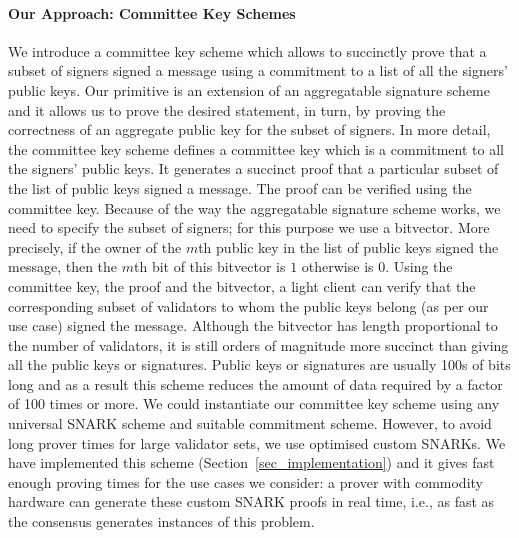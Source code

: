 \paragraph{Our Approach: Committee Key Schemes} We introduce a committee key scheme which allows to succinctly prove that a subset of signers 
signed a message using a commitment to a list of all the signers' public keys. Our primitive is an extension of an aggregatable signature scheme and 
it allows us to prove the desired statement, in turn, by proving the correctness of an aggregate public key for the subset of signers. 
In more detail, the committee key scheme defines a committee key which is a commitment to all the signers' public keys. It generates a succinct proof that a particular subset of the list of public keys signed a message. The proof can be verified using the committee key. 
Because of the way the aggregatable signature scheme works, we need to specify the subset of signers; for this purpose we use a bitvector. 
More precisely, if the owner of the $m$th public key in the list of public keys signed the message, then the $m$th bit of this bitvector is $1$ otherwise is $0$.
Using the committee key, the proof and the bitvector, a light client can verify that the corresponding subset of validators to whom the 
public keys belong (as per our use case) signed the message. Although the bitvector has length proportional to the number of validators, it is still orders of magnitude 
more succinct than giving all the public keys or signatures. Public keys or signatures are usually 100s of bits long and as a result this scheme reduces the amount of 
data required by a factor of 100 times or more. We could instantiate our committee key scheme using any universal SNARK scheme and suitable commitment scheme. 
However, to avoid long prover times for large validator sets, we use optimised custom SNARKs. We have implemented this scheme 
(Section~\ref{sec_implementation}) and it gives fast enough proving times for the use cases we consider: a prover with 
commodity hardware can generate these custom SNARK proofs in real time, i.e., as fast as the consensus generates instances of this problem.

\vspace{-0.2cm}
